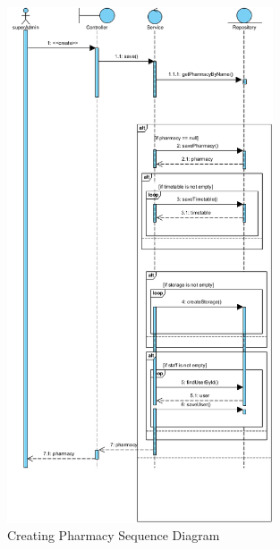 \begin{figure}[H]
\centering
    \includegraphics[width=0.7\textwidth]{sections/BLL/sequenceDiagram.png}
    \caption{Creating Pharmacy Sequence Diagram}
    \label{fig:SD}
\end{figure}

